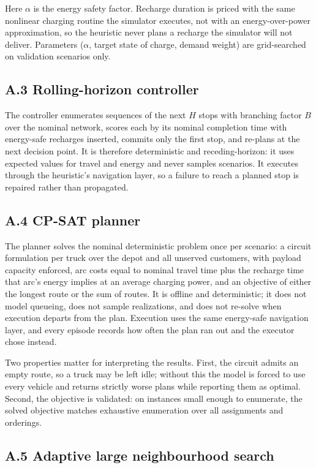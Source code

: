 \documentclass[journal]{IEEEtran}
\begin{document}
\noindent Here $\alpha$ is the energy safety factor. Recharge duration is priced
with the same nonlinear charging routine the simulator executes, not with an
energy-over-power approximation, so the heuristic never plans a recharge the
simulator will not deliver. Parameters ($\alpha$, target state of charge, demand
weight) are grid-searched on validation scenarios only.

\subsection*{A.3 Rolling-horizon controller}

The controller enumerates sequences of the next $H$ stops with branching factor
$B$ over the nominal network, scores each by its nominal completion time with
energy-safe recharges inserted, commits only the first stop, and re-plans at the
next decision point. It is therefore deterministic and receding-horizon: it uses
expected values for travel and energy and never samples scenarios. It executes
through the heuristic's navigation layer, so a failure to reach a planned stop
is repaired rather than propagated.

\subsection*{A.4 CP-SAT planner}

The planner solves the nominal deterministic problem once per scenario: a
circuit formulation per truck over the depot and all unserved customers, with
payload capacity enforced, arc costs equal to nominal travel time plus the
recharge time that arc's energy implies at an average charging power, and an
objective of either the longest route or the sum of routes. It is offline and
deterministic; it does not model queueing, does not sample realizations, and
does not re-solve when execution departs from the plan. Execution uses the same
energy-safe navigation layer, and every episode records how often the plan ran
out and the executor chose instead.

Two properties matter for interpreting the results. First, the circuit admits an
empty route, so a truck may be left idle; without this the model is forced to
use every vehicle and returns strictly worse plans while reporting them as
optimal. Second, the objective is validated: on instances small enough to
enumerate, the solved objective matches exhaustive enumeration over all
assignments and orderings.

\subsection*{A.5 Adaptive large neighbourhood search}
\end{document}
